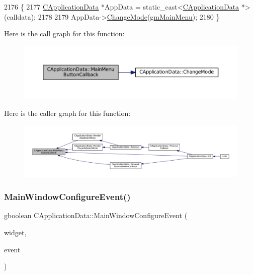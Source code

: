 \begin{DoxyCode}
2176                                                            \{
2177     \hyperlink{classCApplicationData}{CApplicationData} *AppData = \textcolor{keyword}{static\_cast<}\hyperlink{classCApplicationData}{CApplicationData} *\textcolor{keyword}{>}(calldata);
2178     
2179     AppData->\hyperlink{classCApplicationData_aee18c113e9a0acb3cad3d63eb19de71b}{ChangeMode}(\hyperlink{classCApplicationData_ac8ac37a4c8bb871036fbbdc6a072e403ad2500485f81c2bf3c1814a969082783b}{gmMainMenu});
2180 \}
\end{DoxyCode}
Here is the call graph for this function\+:\nopagebreak
\begin{figure}[H]
\begin{center}
\leavevmode
\includegraphics[width=350pt]{classCApplicationData_a4410839118b5b74dab798ad7be6f703b_cgraph}
\end{center}
\end{figure}
Here is the caller graph for this function\+:\nopagebreak
\begin{figure}[H]
\begin{center}
\leavevmode
\includegraphics[width=350pt]{classCApplicationData_a4410839118b5b74dab798ad7be6f703b_icgraph}
\end{center}
\end{figure}
\hypertarget{classCApplicationData_a7abef8a548d0ad3adb70f11d8a74176c}{}\label{classCApplicationData_a7abef8a548d0ad3adb70f11d8a74176c} 
\subsubsection{\texorpdfstring{Main\+Window\+Configure\+Event()}{MainWindowConfigureEvent()}}
{\footnotesize\ttfamily gboolean C\+Application\+Data\+::\+Main\+Window\+Configure\+Event (\begin{DoxyParamCaption}\item[{Gtk\+Widget $\ast$}]{widget,  }\item[{Gdk\+Event $\ast$}]{event }\end{DoxyParamCaption})\hspace{0.3cm}{\ttfamily [protected]}}



